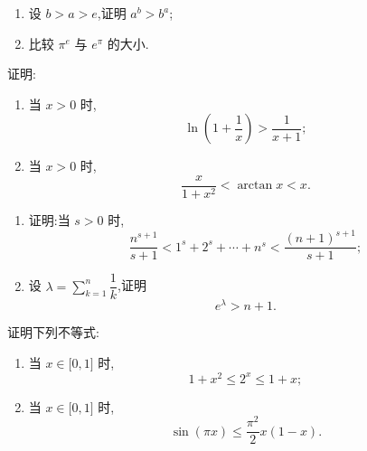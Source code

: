 \documentclass[../../数学分析培优讲义.tex]{subfiles}
\begin{document}
\begin{example}
\begin{enumerate}[label=(\arabic*)]
    \item 设 $b>a>e$,证明 $a^b>b^a$;
    \item 比较 $\pi^e$ 与 $e^\pi$ 的大小.
\end{enumerate}
\end{example}
\exampleblank




\begin{example}
证明:
\begin{enumerate}[label=(\arabic*)]
    \item 当 $x>0$ 时,
    \[
        \ln\left(1+\dfrac{1}{x}\right)>\dfrac{1}{x+1};
    \]
    \item 当 $x>0$ 时,
    \[
        \dfrac{x}{1+x^2}<\arctan x<x.
    \]
\end{enumerate}
\end{example}
\exampleblank

\begin{example}
\begin{enumerate}[label=(\arabic*)]
    \item 证明:当 $s>0$ 时,
    \[
        \dfrac{n^{s+1}}{s+1}
        <1^s+2^s+\cdots+n^s
        <\dfrac{(n+1)^{s+1}}{s+1};
    \]
    \item 设 $\displaystyle\lambda=\sum\limits_{k=1}^n\dfrac{1}{k}$,证明
    \[
        e^\lambda>n+1.
    \]
\end{enumerate}
\end{example}
\exampleblank




\begin{example}
证明下列不等式:
\begin{enumerate}[label=(\arabic*)]
    \item 当 $x\in\lbrack 0,1\rbrack$ 时,
    \[
        1+x^2\leq2^x\leq1+x;
    \]
    \item 当 $x\in\lbrack 0,1\rbrack$ 时,
    \[
        \sin(\pi x)\leq\dfrac{\pi^2}{2}x(1-x).
    \]
\end{enumerate}
\end{example}
\exampleblank
\end{document}
